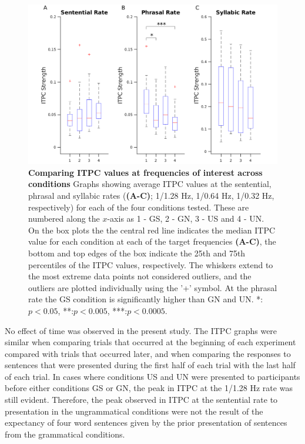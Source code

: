 \documentclass[a4paper,10pt,twoside]{article}
\begin{document}
\begin{figure}[tbp]
\includegraphics[width=\linewidth]{ITPC_peaks.png}
\caption{\textbf{Comparing ITPC values at frequencies of interest
    across conditions} Graphs showing average ITPC values at the
  sentential, phrasal and syllabic rates (\textbf{(A-C)}; 1/1.28 Hz,
  1/0.64 Hz, 1/0.32 Hz, respectively) for each of the four conditions
  tested. These are numbered along the $x$-axis as 1 - GS, 2 - GN, 3 -
  US and 4 - UN.  On the box plots the the central red line indicates
  the median ITPC value for each condition at each of the target
  frequencies \textbf{(A-C)}, the bottom and top edges of the box
  indicate the 25th and 75th percentiles of the ITPC values,
  respectively. The whiskers extend to the most extreme data points
  not considered outliers, and the outliers are plotted individually
  using the '+' symbol.  At the phrasal rate the GS condition is
  significantly higher than GN and UN. *:$p<0.05$, **:$p<0.005$,
  ***:$p<0.0005$. }
\label{ITPC_peaks}
\end{figure}

No effect of time was observed in the present study. The ITPC graphs
were similar when comparing trials that occurred at the beginning of
each experiment compared with trials that occurred later, and when
comparing the responses to sentences that were presented during the
first half of each trial with the last half of each trial. In cases
where conditions US and UN were presented to participants before
either conditions GS or GN, the peak in ITPC at the 1/1.28 Hz rate was
still evident. Therefore, the peak observed in ITPC at the sentential
rate to presentation in the ungrammatical conditions were not the
result of the expectancy of four word sentences given by the prior
presentation of sentences from the grammatical conditions.
\end{document}
